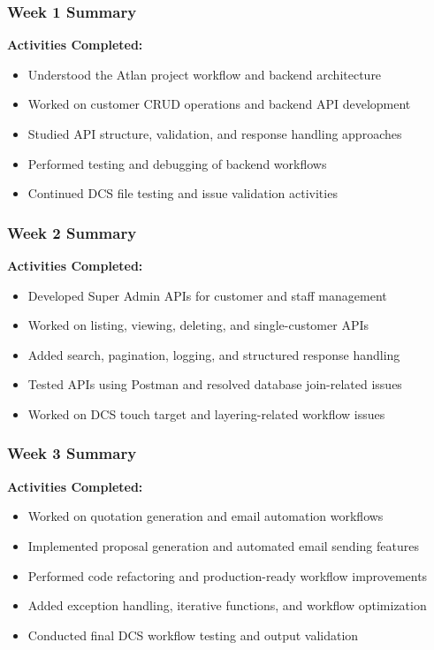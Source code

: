 \documentclass[12pt,a4paper]{report}
\begin{document}
\subsubsection*{Week 1 Summary}
\textbf{Activities Completed:}
\begin{itemize}[leftmargin=1.5cm]
    \item Understood the Atlan project workflow and backend architecture
    \item Worked on customer CRUD operations and backend API development
    \item Studied API structure, validation, and response handling approaches
    \item Performed testing and debugging of backend workflows
    \item Continued DCS file testing and issue validation activities
\end{itemize}

\subsubsection*{Week 2 Summary}
\textbf{Activities Completed:}
\begin{itemize}[leftmargin=1.5cm]
    \item Developed Super Admin APIs for customer and staff management
    \item Worked on listing, viewing, deleting, and single-customer APIs
    \item Added search, pagination, logging, and structured response handling
    \item Tested APIs using Postman and resolved database join-related issues
    \item Worked on DCS touch target and layering-related workflow issues
\end{itemize}

\subsubsection*{Week 3 Summary}
\textbf{Activities Completed:}
\begin{itemize}[leftmargin=1.5cm]
    \item Worked on quotation generation and email automation workflows
    \item Implemented proposal generation and automated email sending features
    \item Performed code refactoring and production-ready workflow improvements
    \item Added exception handling, iterative functions, and workflow optimization
    \item Conducted final DCS workflow testing and output validation
\end{itemize}
\end{document}
